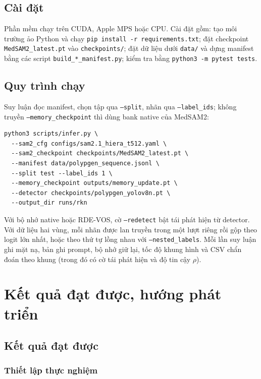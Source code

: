 \documentclass[a4paper,12pt]{report}
\begin{document}
\subsection{Cài đặt}

Phần mềm chạy trên CUDA, Apple MPS hoặc CPU. Cài đặt gồm: tạo môi trường ảo Python và chạy \texttt{pip install -r requirements.txt}; đặt checkpoint \texttt{MedSAM2\_latest.pt} vào \texttt{checkpoints/}; đặt dữ liệu dưới \texttt{data/} và dựng manifest bằng các script \texttt{build\_*\_manifest.py}; kiểm tra bằng \texttt{python3 -m pytest tests}.

\subsection{Quy trình chạy}

Suy luận đọc manifest, chọn tập qua \texttt{--split}, nhãn qua \texttt{--label\_ids}; không truyền \texttt{--memory\_checkpoint} thì dùng bank native của MedSAM2:
{\small
\begin{verbatim}
python3 scripts/infer.py \
  --sam2_cfg configs/sam2.1_hiera_t512.yaml \
  --sam2_checkpoint checkpoints/MedSAM2_latest.pt \
  --manifest data/polypgen_sequence.jsonl \
  --split test --label_ids 1 \
  --memory_checkpoint outputs/memory_update.pt \
  --detector checkpoints/polypgen_yolov8n.pt \
  --output_dir runs/rkn
\end{verbatim}}
Với bộ nhớ native hoặc RDE-VOS, cờ \texttt{--redetect} bật tái phát hiện từ detector. Với dữ liệu hai vùng, mỗi nhãn được lan truyền trong một lượt riêng rồi gộp theo logit lớn nhất, hoặc theo thứ tự lồng nhau với \texttt{--nested\_labels}. Mỗi lần suy luận ghi mặt nạ, bản ghi prompt, bộ nhớ giữ lại, tốc độ khung hình và CSV chẩn đoán theo khung (trong đó có cờ tái phát hiện và độ tin cậy $\rho$).

\section{Kết quả đạt được, hướng phát triển}
\label{sec:results}
\subsection{Kết quả đạt được}

\subsubsection{Thiết lập thực nghiệm}
\end{document}
